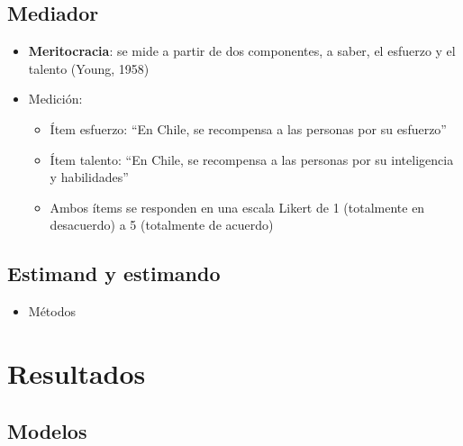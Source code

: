 \documentclass[
  spanish,
  letterpaper,
  DIV=11,
  numbers=noendperiod,
  oneside]{scrartcl}
\providecommand{\tightlist}{%
  \setlength{\itemsep}{0pt}\setlength{\parskip}{0pt}}
\begin{document}
\subsection{Mediador}\label{mediador}

\begin{itemize}
\item
  \textbf{Meritocracia}: se mide a partir de dos componentes, a saber,
  el esfuerzo y el talento (Young, 1958)
\item
  Medición:

  \begin{itemize}
  \tightlist
  \item
    Ítem esfuerzo: ``En Chile, se recompensa a las personas por su
    esfuerzo''
  \item
    Ítem talento: ``En Chile, se recompensa a las personas por su
    inteligencia y habilidades''
  \item
    Ambos ítems se responden en una escala Likert de 1 (totalmente en
    desacuerdo) a 5 (totalmente de acuerdo)
  \end{itemize}
\end{itemize}

\subsection{Estimand y estimando}\label{estimand-y-estimando}

\begin{itemize}
\tightlist
\item
  Métodos
\end{itemize}

\section{Resultados}\label{resultados}

\subsection{Modelos}\label{modelos}
\end{document}
